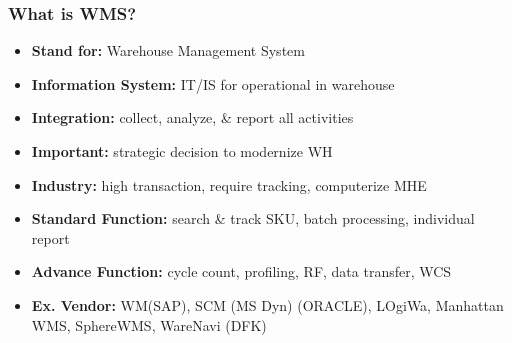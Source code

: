 \documentclass[10pt,handout,notes=show]{beamer}
\begin{document}
\begin{frame}
  \frametitle{What is WMS?}

  \begin{itemize}
    \item \textbf{Stand for:} \alert{Warehouse} Management System
    \item \textbf{Information System:} IT/IS for operational in warehouse
    \item \textbf{Integration:} collect, analyze, \& report all \alert{activities}
    \item \textbf{Important:} strategic decision to modernize WH
    \item \textbf{Industry:} high transaction, require tracking, computerize MHE
    \item \textbf{Standard Function:} search \& track SKU, batch processing, individual report
    \item \textbf{Advance Function:} cycle count, profiling, RF, data transfer, \alert{WCS}
    \item \textbf{Ex. Vendor:} WM(SAP), SCM (MS Dyn) (ORACLE), LOgiWa,  Manhattan WMS, SphereWMS, WareNavi (DFK)
  \end{itemize}


\end{frame}
\end{document}
